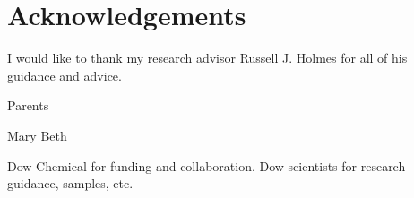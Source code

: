 \documentclass[../thesis.tex]{subfiles}
\begin{document}
\section*{Acknowledgements}

I would like to thank my research advisor Russell J. Holmes for all of his guidance and advice.

Parents

Mary Beth

Dow Chemical for funding and collaboration.  Dow scientists for research guidance, samples, etc.
\end{document}
